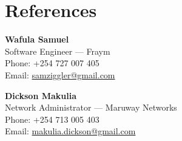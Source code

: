\documentclass[a4paper,10pt]{article}
\begin{document}
\section*{References}

\textbf{Wafula Samuel} \\
Software Engineer — Fraym \\
Phone: +254 727 007 405 \\
Email: \href{mailto:samziggler@gmail.com}{samziggler@gmail.com}

\vspace{0.5em}

\textbf{Dickson Makulia} \\
Network Administrator — Maruway Networks \\
Phone: +254 713 005 403 \\
Email: \href{mailto:makulia.dickson@gmail.com}{makulia.dickson@gmail.com}
\end{document}
